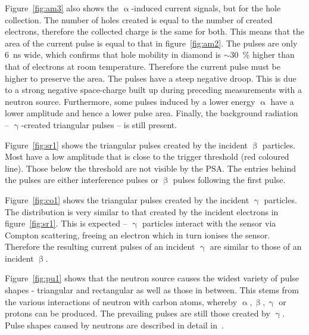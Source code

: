 Figure~\ref{fig:am3} also shows the $\upalpha$-induced current signals, but for the hole collection. The number of holes created is equal to the number of created electrons, therefore the collected charge is the same for both. This means that the area of the current pulse is equal to that in figure~\ref{fig:am2}. The pulses are only 6~ns wide, which confirms that hole mobility in diamond is $\sim$30~\% higher than that of electrons at room temperature. Therefore the current pulse must be higher to preserve the area. The pulses have a steep negative droop. This is due to a strong negative space-charge built up during preceding measurements with a neutron source. Furthermore, some pulses induced by a lower energy $\upalpha$ have a lower amplitude and hence a lower pulse area. Finally, the background radiation -- $\upgamma$-created triangular pulses -- is still present.

Figure~\ref{fig:sr1} shows the triangular pulses created by the incident $\upbeta$ particles. Most have a low amplitude that is close to the trigger threshold (red coloured line). Those below the threshold are not visible by the PSA. The entries behind the pulses are either interference pulses or $\upbeta$ pulses following the first pulse.

Figure~\ref{fig:co1} shows the triangular pulses created by the incident $\upgamma$ particles. The distribution is very similar to that created by the incident electrons in figure~\ref{fig:sr1}. This is expected -- $\upgamma$ particles interact with the sensor via Compton scattering, freeing an electron which in turn ionises the sensor. Therefore the resulting current pulses of an incident $\upgamma$ are similar to those of an incident $\upbeta$.

Figure~\ref{fig:pu1} shows that the neutron source causes the widest variety of pulse shapes - triangular and rectangular as well as those in between. This stems from the various interactions of neutron with carbon atoms, whereby $\upalpha, \upbeta, \upgamma$ or protons can be produced. The prevailing pulses are still those created by $\upgamma$. %
Pulse shapes caused by neutrons are described in detail in~\cite{PAVEL:00003, CHRISSI:00005}. 








